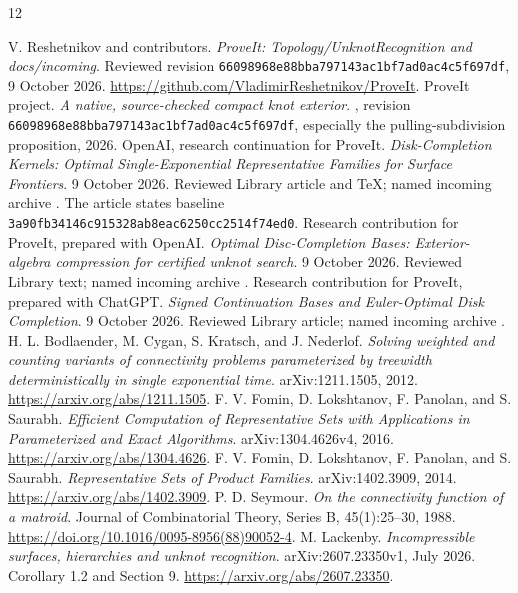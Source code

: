 \documentclass[11pt,a4paper]{article}
\theoremstyle{definition}
\theoremstyle{remark}
\newcommand{\snapshot}{66098968e88bba797143ac1bf7ad0ac4c5f697df}
\begin{document}
\clearpage
{}
\begin{thebibliography}{12}
\small\raggedright
\setlength{\itemsep}{2pt}\setlength{\parsep}{0pt}\setlength{\parskip}{0pt}
V. Reshetnikov and contributors. \emph{ProveIt: Topology/UnknotRecognition and
docs/incoming}. Reviewed revision \texttt{\snapshot}, 9 October 2026.
\url{https://github.com/VladimirReshetnikov/ProveIt}.
ProveIt project. \emph{A native, source-checked compact knot exterior}.
,
revision \texttt{\snapshot}, especially the pulling-subdivision proposition, 2026.
OpenAI, research continuation for ProveIt. \emph{Disk-Completion Kernels: Optimal
Single-Exponential Representative Families for Surface Frontiers}. 9 October 2026.
Reviewed Library article and TeX; named incoming archive
.
The article states baseline \texttt{3a90fb34146c915328ab8eac6250cc2514f74ed0}.
Research contribution for ProveIt, prepared with OpenAI. \emph{Optimal Disc-Completion
Bases: Exterior-algebra compression for certified unknot search}. 9 October 2026.
Reviewed Library text; named incoming archive
.
Research contribution for ProveIt, prepared with ChatGPT. \emph{Signed Continuation Bases
and Euler-Optimal Disk Completion}. 9 October 2026. Reviewed Library article;
named incoming archive .
H. L. Bodlaender, M. Cygan, S. Kratsch, and J. Nederlof.
\emph{Solving weighted and counting variants of connectivity problems parameterized by
treewidth deterministically in single exponential time}. arXiv:1211.1505, 2012.
\url{https://arxiv.org/abs/1211.1505}.
F. V. Fomin, D. Lokshtanov, F. Panolan, and S. Saurabh.
\emph{Efficient Computation of Representative Sets with Applications in Parameterized and
Exact Algorithms}. arXiv:1304.4626v4, 2016. \url{https://arxiv.org/abs/1304.4626}.
F. V. Fomin, D. Lokshtanov, F. Panolan, and S. Saurabh.
\emph{Representative Sets of Product Families}. arXiv:1402.3909, 2014.
\url{https://arxiv.org/abs/1402.3909}.
P. D. Seymour. \emph{On the connectivity function of a matroid}.
Journal of Combinatorial Theory, Series B, 45(1):25--30, 1988.
\url{https://doi.org/10.1016/0095-8956(88)90052-4}.
M. Lackenby. \emph{Incompressible surfaces, hierarchies and unknot recognition}.
arXiv:2607.23350v1, July 2026. Corollary 1.2 and Section 9.
\url{https://arxiv.org/abs/2607.23350}.
\end{thebibliography}
\end{document}
